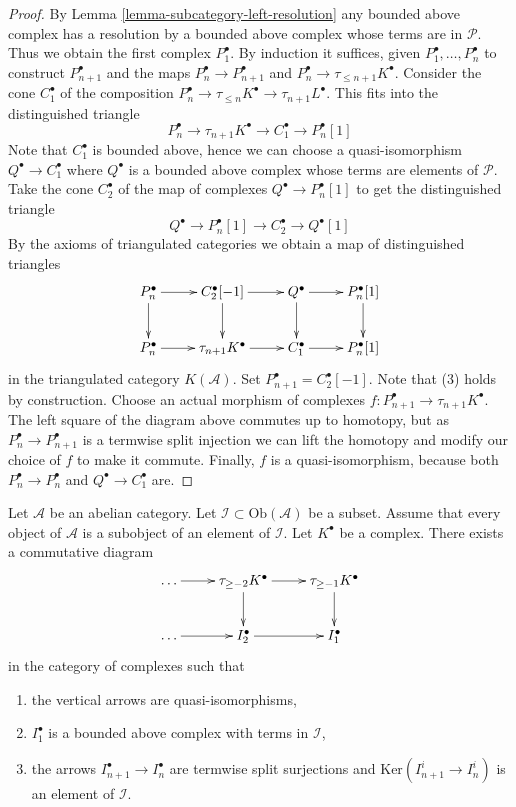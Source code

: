 \begin{proof}
By
Lemma \ref{lemma-subcategory-left-resolution}
any bounded above complex has a resolution by a bounded above complex
whose terms are in $\mathcal{P}$. Thus we obtain the first complex
$P_1^\bullet$. By induction it suffices, given
$P_1^\bullet, \ldots, P_n^\bullet$ to construct
$P_{n + 1}^\bullet$ and the maps
$P_n^\bullet \to P_{n + 1}^\bullet$ and
$P_n^\bullet \to \tau_{\leq n + 1}K^\bullet$.
Consider the cone $C_1^\bullet$ of the composition
$P_n^\bullet \to \tau_{\leq n}K^\bullet \to \tau_{n + 1}L^\bullet$.
This fits into the distinguished triangle
$$
P_n^\bullet \to \tau_{n + 1}K^\bullet \to C_1^\bullet \to P_n^\bullet[1]
$$
Note that $C_1^\bullet$ is bounded above, hence we can choose a
quasi-isomorphism $Q^\bullet \to C_1^\bullet$ where $Q^\bullet$ is a
bounded above complex whose terms are elements of $\mathcal{P}$.
Take the cone $C_2^\bullet$ of the map of complexes
$Q^\bullet \to P_n^\bullet[1]$ to get the
distinguished triangle
$$
Q^\bullet \to P_n^\bullet[1] \to C_2^\bullet \to Q^\bullet[1]
$$
By the axioms of triangulated categories we obtain a map
of distinguished triangles
$$
\xymatrix{
P_n^\bullet \ar[r] \ar[d] &
C_2^\bullet[-1] \ar[r] \ar[d] &
Q^\bullet \ar[r] \ar[d] &
P_n^\bullet[1] \ar[d] \\
P_n^\bullet \ar[r] &
\tau_{n + 1}K^\bullet \ar[r] &
C_1^\bullet \ar[r] &
P_n^\bullet[1]
}
$$
in the triangulated category $K(\mathcal{A})$.
Set $P_{n + 1}^\bullet = C_2^\bullet[-1]$.
Note that (3) holds by construction.
Choose an actual morphism of complexes
$f : P_{n + 1}^\bullet \to \tau_{n + 1}K^\bullet$.
The left square of the diagram above commutes up to homotopy, but as
$P_n^\bullet \to P_{n + 1}^\bullet$ is a termwise split injection
we can lift the homotopy and modify our choice of $f$ to make it commute.
Finally, $f$ is a quasi-isomorphism, because both $P_n^\bullet \to P_n^\bullet$
and $Q^\bullet \to C_1^\bullet$ are.
\end{proof}

\begin{lemma}
\label{lemma-special-inverse-system}
Let $\mathcal{A}$ be an abelian category. Let
$\mathcal{I} \subset \text{Ob}(\mathcal{A})$ be a subset.
Assume that every object of $\mathcal{A}$ is a subobject of an
element of $\mathcal{I}$. Let $K^\bullet$ be a complex.
There exists a commutative diagram
$$
\xymatrix{
\ldots \ar[r] &
\tau_{\geq -2}K^\bullet \ar[r] \ar[d] &
\tau_{\geq -1}K^\bullet \ar[d] \\
\ldots \ar[r] & I_2^\bullet \ar[r] & I_1^\bullet 
}
$$
in the category of complexes such that
\begin{enumerate}
\item the vertical arrows are quasi-isomorphisms,
\item $I_1^\bullet$ is a bounded above complex with terms in
$\mathcal{I}$,
\item the arrows $I_{n + 1}^\bullet \to I_n^\bullet$
are termwise split surjections and
$\text{Ker}(I^i_{n + 1} \to I^i_n)$ is an
element of $\mathcal{I}$.
\end{enumerate}
\end{lemma}

